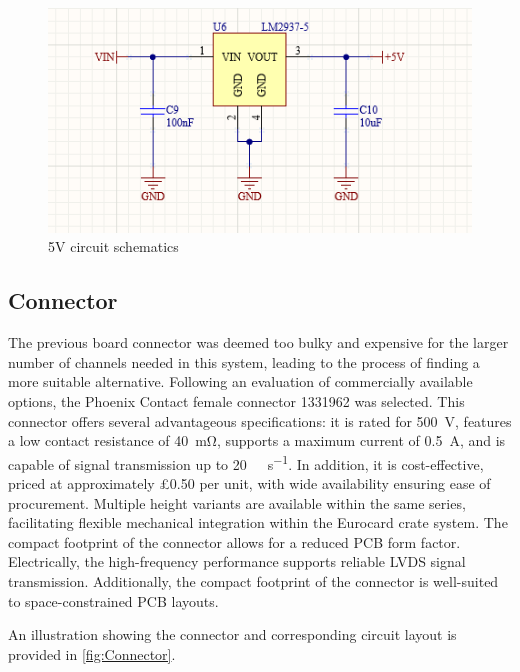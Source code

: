 \documentclass[a4paper,11pt]{article}
\begin{document}
\begin{figure}[htbp]
\centering
\includegraphics[scale=0.7]{5VCircuit.png}
\caption{5V circuit schematics\label{fig:5VCircuit}}
\end{figure}

\subsection{Connector}

The previous board connector was deemed too bulky and expensive for the larger number of channels needed in this system, leading to the process of finding a more suitable alternative. Following an evaluation of commercially available options, the Phoenix Contact female connector 1331962 \cite{1331962} was selected. This connector offers several advantageous specifications: it is rated for \SI{500}{\volt}, features a low contact resistance of \SI{40}{\milli\ohm}, supports a maximum current of \SI{0.5}{\ampere}, and is capable of signal transmission up to \SI{20}{\giga\bit\per\second}. In addition, it is cost-effective, priced at approximately \pounds 0.50 per unit, with wide availability ensuring ease of procurement. Multiple height variants are available within the same series, facilitating flexible mechanical integration within the Eurocard crate system. The compact footprint of the connector allows for a reduced PCB form factor. Electrically, the high-frequency performance supports reliable LVDS signal transmission. Additionally, the compact footprint of the connector is well-suited to space-constrained PCB layouts.

An illustration showing the connector and corresponding circuit layout is provided in \cref{fig:Connector}.
\end{document}

